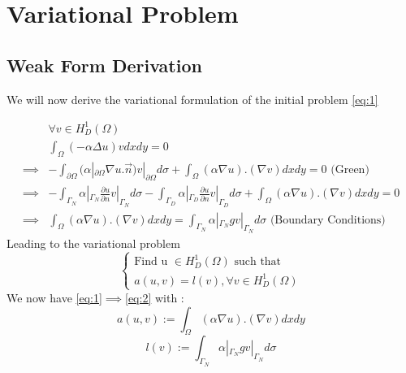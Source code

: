 \documentclass[a4paper]{report}
\begin{document}
\chapter{Variational Problem}
\section{Weak Form Derivation}
We will now derive the variational formulation of the initial problem \ref{eq:1}


\begin{align*}
&\forall v \in H^1_D(\Omega)\\
&\int_\Omega (- \alpha \Delta u)v dxdy=0\\
\implies & - \int_{\partial \Omega} (\alpha|_{\partial \Omega} \nabla u.\overrightarrow{n}) v|_{\partial \Omega}  d \sigma+
\int_\Omega (\alpha \nabla u).(\nabla v)dxdy=0
\text{ (Green)}
\\
\implies & - \int_{\Gamma_N} \alpha|_{\Gamma_N} \frac{\partial u}{\partial n}v|_{\Gamma_N}  d\sigma-
 \int_{\Gamma_D} \alpha|_{\Gamma_D} \frac{\partial u}{\partial n}v|_{\Gamma_D}d \sigma +\int_\Omega (\alpha\nabla u).(\nabla v)dxdy=0\\
 \implies & \int_\Omega (\alpha\nabla u).(\nabla v)dxdy =\int_{\Gamma_N} \alpha|_{\Gamma_N}gv|_{\Gamma_N} d\sigma \text{ (Boundary Conditions)}
\end{align*}
Leading to the variational problem
\begin{equation}\label{eq:2}
\left\{
\begin{array}{l}
\text{Find u $\in H^1_D(\Omega)$ such that}\\
a(u,v)=l(v), \forall v \in H^1_D(\Omega)
\end{array}
\right.
\end{equation}
We now have \ref{eq:1}$\implies $\ref{eq:2} with :
\[
a(u,v):=\int_\Omega (\alpha\nabla u).(\nabla v)dxdy
\]
\[
l(v):=\int_{\Gamma_N} \alpha |_{\Gamma_N}gv|_{\Gamma_N} d\sigma
\]
\end{document}
